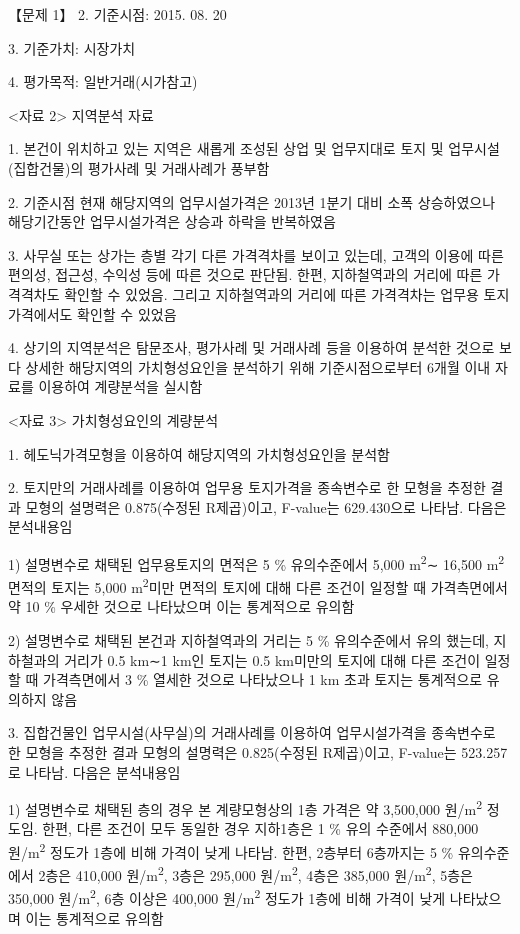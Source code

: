 \begin{longquestion}{【문제 1】}
2. 기준시점: 2015. 08. 20 \par
3. 기준가치: 시장가치 \par
4. 평가목적: 일반거래(시가참고) \par
<자료 2> 지역분석 자료 \par
1. 본건이 위치하고 있는 지역은 새롭게 조성된 상업 및 업무지대로 토지 및 업무시설(집합건물)의 평가사례 및 거래사례가 풍부함 \par
2. 기준시점 현재 해당지역의 업무시설가격은 2013년 1분기 대비 소폭 상승하였으나 해당기간동안 업무시설가격은 상승과 하락을 반복하였음 \par
3. 사무실 또는 상가는 층별 각기 다른 가격격차를 보이고 있는데, 고객의 이용에 따른 편의성, 접근성, 수익성 등에 따른 것으로 판단됨. 한편, 지하철역과의 거리에 따른 가격격차도 확인할 수 있었음. 그리고 지하철역과의 거리에 따른 가격격차는 업무용 토지가격에서도 확인할 수 있었음 \par
4. 상기의 지역분석은 탐문조사, 평가사례 및 거래사례 등을 이용하여 분석한 것으로 보다 상세한 해당지역의 가치형성요인을 분석하기 위해 기준시점으로부터 6개월 이내 자료를 이용하여 계량분석을 실시함 \par
<자료 3> 가치형성요인의 계량분석 \par
1. 헤도닉가격모형을 이용하여 해당지역의 가치형성요인을 분석함 \par
2. 토지만의 거래사례를 이용하여 업무용 토지가격을 종속변수로 한 모형을 추정한 결과 모형의 설명력은 0.875(수정된 R제곱)이고, F-value는 629.430으로 나타남. 다음은 분석내용임 \par
1) 설명변수로 채택된 업무용토지의 면적은 5 \% 유의수준에서 5,000 m\textsuperscript{2}∼ 16,500 m\textsuperscript{2} 면적의 토지는 5,000 m\textsuperscript{2}미만 면적의 토지에 대해 다른 조건이 일정할 때 가격측면에서 약 10 \% 우세한 것으로 나타났으며 이는 통계적으로 유의함 \par
2) 설명변수로 채택된 본건과 지하철역과의 거리는 5 \% 유의수준에서 유의 했는데, 지하철과의 거리가 0.5 km∼1 km인 토지는 0.5 km미만의 토지에 대해 다른 조건이 일정할 때 가격측면에서 3 \% 열세한 것으로 나타났으나 1 km 초과 토지는 통계적으로 유의하지 않음 \par
3. 집합건물인 업무시설(사무실)의 거래사례를 이용하여 업무시설가격을 종속변수로 한 모형을 추정한 결과 모형의 설명력은 0.825(수정된 R제곱)이고, F-value는 523.257로 나타남. 다음은 분석내용임 \par
1) 설명변수로 채택된 층의 경우 본 계량모형상의 1층 가격은 약 3,500,000 원/m\textsuperscript{2} 정도임. 한편, 다른 조건이 모두 동일한 경우 지하1층은 1 \% 유의 수준에서 880,000 원/m\textsuperscript{2} 정도가 1층에 비해 가격이 낮게 나타남. 한편, 2층부터 6층까지는 5 \% 유의수준에서 2층은 410,000 원/m\textsuperscript{2}, 3층은 295,000 원/m\textsuperscript{2}, 4층은 385,000 원/m\textsuperscript{2}, 5층은 350,000 원/m\textsuperscript{2}, 6층 이상은 400,000 원/m\textsuperscript{2} 정도가 1층에 비해 가격이 낮게 나타났으며 이는 통계적으로 유의함 \par

\end{longquestion}
